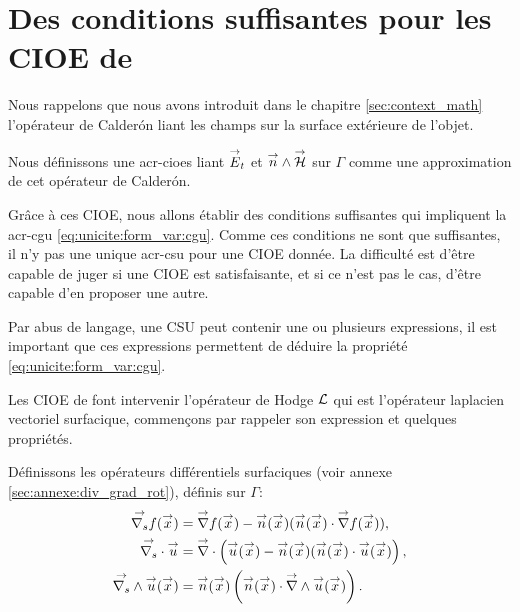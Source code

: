 \section[Des CSU pour les CIOE de Stupfel et Poget 2011]{Des conditions suffisantes pour les CIOE de \cite{stupfel_sufficient_2011}}

  Nous rappelons que nous avons introduit dans le chapitre \ref{sec:context_math} l'opérateur de Calderón liant les champs sur la surface extérieure de l'objet. 


  Nous définissons une \glspl{acr-cioe} liant \(\vE_t\) et \(\vn\pvect\vH\) sur \(\Gamma\) comme une approximation de cet opérateur de Calderón.

  Grâce à ces CIOE, nous allons établir des conditions suffisantes qui impliquent la \gls{acr-cgu} \eqref{eq:unicite:form_var:cgu}.
  Comme ces conditions ne sont que suffisantes, il n'y pas une unique \gls{acr-csu} pour une CIOE donnée.
  La difficulté est d'être capable de juger si une CIOE est satisfaisante, et si ce n'est pas le cas, d'être capable d'en proposer une autre.

  Par abus de langage, une CSU peut contenir une ou plusieurs expressions, il est important que ces expressions permettent de déduire la propriété \eqref{eq:unicite:form_var:cgu}.

  Les CIOE de \cite{stupfel_sufficient_2011} font intervenir l'opérateur de Hodge \(\LL\) qui est l'opérateur laplacien vectoriel surfacique, commençons par rappeler son expression et quelques propriétés.

  Définissons les opérateurs différentiels surfaciques (voir annexe \ref{sec:annexe:div_grad_rot}), définis sur \(\Gamma\):
  \begin{align*}
      \vgrads{f}(\vx) &= \vgrad{f}(\vx) - \vn(\vx) (\vn(\vx) \cdot \vgrad{f}(\vx)),
      \\
      \vdivs{\vu} &= \vdiv\left(\vu(\vx) - \vn(\vx) (\vn(\vx) \cdot \vu(\vx)\right),
      \\
      \vrots{\vu}(\vx) &= \vn(\vx)\left(\vn(\vx) \cdot \vrot{\vu}(\vx)\right).
  \end{align*}


